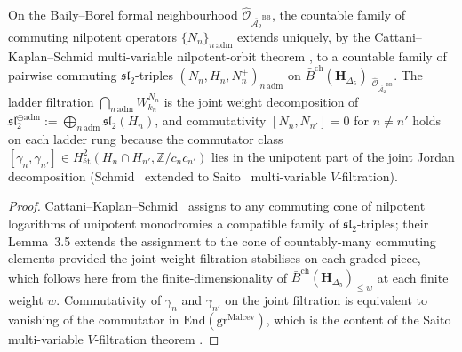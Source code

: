 \begin{lemma}
\label{lem:sl2-admissible-splitting}
\ClaimStatusProvedElsewhere
{}%
On the Baily--Borel formal neighbourhood
$\widehat{\mathcal{O}}_{\overline{\mathcal{A}_2}^{\mathrm{BB}}}$, the
countable family of commuting nilpotent operators
$\{N_n\}_{n\,\mathrm{adm}}$ extends uniquely, by the Cattani--Kaplan--Schmid
multi-variable nilpotent-orbit theorem
\cite[\S 3.7]{CattaniKaplanSchmid1986}, to a countable family of
pairwise commuting $\mathfrak{sl}_2$-triples
$(N_n,H_n,N^+_n)_{n\,\mathrm{adm}}$ on
$\bar B^{\mathrm{ch}}(\mathbf{H}_{\Delta_5})|_{\widehat{\mathcal{O}}_{\overline{\mathcal{A}_2}^{\mathrm{BB}}}}$.
The ladder filtration
$\bigcap_{n\,\mathrm{adm}} W^{N_n}_{k_n}$ is the joint weight
decomposition of
$\mathfrak{sl}_2^{\oplus\mathrm{adm}}:=\bigoplus_{n\,\mathrm{adm}}\mathfrak{sl}_2(H_n)$,
and commutativity $[N_n,N_{n'}]=0$ for $n\neq n'$ holds on each ladder
rung because the commutator class
$[\gamma_n,\gamma_{n'}]\in H^2_{\text{\'et}}(H_n\cap H_{n'},\mathbb Z/c_nc_{n'})$
lies in the unipotent part of the joint Jordan decomposition
(Schmid~\cite[Thm.~4.9]{Schmid1973} extended to
Saito~\cite[Appendix~A]{SaitoMHM1988} multi-variable
$V$-filtration).
\end{lemma}

\begin{proof}
Cattani--Kaplan--Schmid~\cite[Thm.~3.3, \S 3.7]{CattaniKaplanSchmid1986}
assigns to any commuting cone of nilpotent logarithms of unipotent
monodromies a compatible family of $\mathfrak{sl}_2$-triples; their
Lemma~3.5 extends the assignment to the cone of countably-many
commuting elements provided the joint weight filtration stabilises on
each graded piece, which follows here from the finite-dimensionality
of $\bar B^{\mathrm{ch}}(\mathbf{H}_{\Delta_5})_{\leq w}$ at each
finite weight $w$. Commutativity of $\gamma_n$ and $\gamma_{n'}$ on
the joint filtration is equivalent to vanishing of the commutator in
$\mathrm{End}(\mathrm{gr}^{\mathrm{Malcev}})$, which is the content of
the Saito multi-variable $V$-filtration theorem
\cite[Thm.~A.3]{SaitoMHM1988}.
\end{proof}

